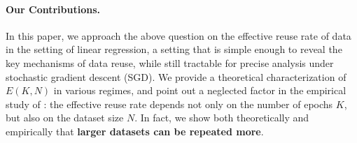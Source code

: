 \paragraph{Our Contributions.}
In this paper, we approach the above question on the effective reuse rate of data in the setting of linear regression, a setting that is simple enough to reveal the key mechanisms of data reuse, while still tractable for precise analysis under stochastic gradient descent (SGD).
We provide a theoretical characterization of $E(K, N)$ in various regimes, and point out a neglected factor in the empirical study of \citet{muennighoff2023scaling}: the effective reuse rate depends not only on the number of epochs $K$, but also on the dataset size $N$.
In fact, we show both theoretically and empirically that \textbf{larger datasets can be repeated more}.
